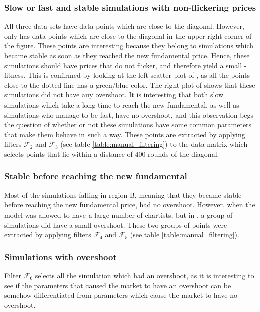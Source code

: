 \subsubsection*{Slow or fast and stable simulations with non-flickering prices}
All three data sets have data points which are close to the diagonal. However, only \dnine{} has data points which are close to the diagonal in the upper right corner of the figure. These points are interesting because they belong to simulations which became stable as soon as they reached the new fundamental price. Hence, these simulations should have prices that do not flicker, and therefore yield a small \stdev-fitness. This is confirmed by looking at the left scatter plot of \dnine, as all the points close to the dotted line has a green/blue color. The right plot of \dnine{} shows that these simulations did not have any overshoot. It is interesting that both slow simulations which take a long time to reach the new fundamental, as well as simulations who manage to be fast, have no overshoot, and this observation begs the question of whether or not these simulations have some common parameters that make them behave in such a way. These points are extracted by applying filters $\mathcal{F}_2$ and $\mathcal{F}_3$ (see table \ref{table:manual_filtering}) to the data matrix \datamatrixfit{\dnine} which selects points that lie within a distance of 400 rounds of the diagonal. 


\subsubsection*{Stable before reaching the new fundamental}
Most of the simulations falling in region B, meaning that they became stable before reaching the new fundamental price, had no overshoot. However, when the model was allowed to have a large number of chartists, but in \deleven, a group of simulations did have a small overshoot. These two groups of points were extracted by applying filters $\mathcal{F}_4$ and $\mathcal{F}_5$  (see table \ref{table:manual_filtering}).

\subsubsection*{Simulations with overshoot}
Filter $\mathcal{F}_6$ selects all the simulation which had an overshoot, as it is interesting to see if the parameters that caused the market to have an overshoot can be somehow differentiated from parameters which cause the market to have no overshoot.

